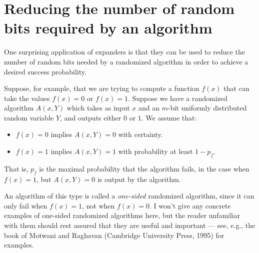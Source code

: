 \documentclass[12pt]{article}
\begin{document}




\section{Reducing the number of random bits required by an algorithm}

One surprising application of expanders is that they can be used to
reduce the number of random bits needed by a randomized algorithm in
order to achieve a desired success probability.

Suppose, for example, that we are trying to compute a function $f(x)$
that can take the values $f(x) = 0$ or $f(x) = 1$.  Suppose we have a
randomized algorithm $A(x,Y)$ which takes as input $x$ and an $m$-bit
uniformly distributed random variable $Y$, and outputs either $0$ or
$1$.  We assume that:
\begin{itemize}
\item $f(x) = 0$ implies $A(x,Y) = 0$ with certainty.
  
\item $f(x) = 1$ implies $A(x,Y) = 1$ with probability at least
  $1-p_f$.
\end{itemize}
That is, $p_f$ is the maximal probability that the algorithm fails, in
the case when $f(x) = 1$, but $A(x,Y) = 0$ is output by the algorithm.

An algorithm of this type is called a \emph{one-sided} randomized
algorithm, since it can only fail when $f(x) = 1$, not when $f(x) =
0$.  I won't give any concrete examples of one-sided randomized
algorithms here, but the reader unfamiliar with them should rest
assured that they are useful and important --- see, e.g., the book of
Motwani and Raghavan (Cambridge University Press, 1995) for examples.
\end{document}
